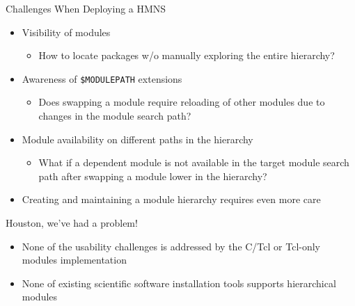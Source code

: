 \documentclass[10pt,xcolor={usenames,dvipsnames}]{beamer}
\begin{document}
\begin{frame}{Challenges When Deploying a HMNS}
\begin{itemize}
    \item
        Visibility of modules
        \begin{itemize}
            \item
                How to locate packages w/o manually exploring the entire
                hierarchy?
        \end{itemize}
    \item
        Awareness of \texttt{\$MODULEPATH} extensions
        \begin{itemize}
            \item
                Does swapping a module require reloading of other modules due
                to changes in the module search path?
        \end{itemize}
    \item
        Module availability on different paths in the hierarchy
        \begin{itemize}
            \item
                What if a dependent module is not available in the target
                module search path after swapping a module lower in the
                hierarchy?
        \end{itemize}
    \item
        Creating and maintaining a module hierarchy requires even more care
\end{itemize}
\begin{center}
    \begin{minipage}{0.9\textwidth}
        \begin{alertblock}{Houston, we've had a problem!}
            \footnotesize
            \begin{itemize}
                \item
                    None of the usability challenges is addressed by the
                    C/Tcl or Tcl-only modules implementation
                \item
                    None of existing scientific software installation tools
                    supports hierarchical modules
            \end{itemize}
        \end{alertblock}
    \end{minipage}
\end{center}
\end{frame}

\end{document}
